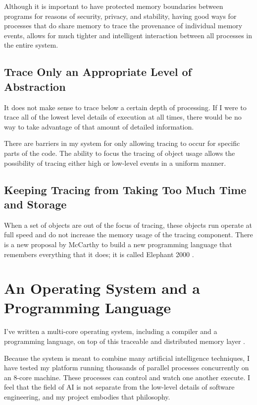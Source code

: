 Although it is important to have protected memory boundaries between
programs for reasons of security, privacy, and stability, having good
ways for processes that do share memory to trace the provenance of
individual memory events, allows for much tighter and intelligent
interaction between all processes in the entire system.
        

\subsection{Trace Only an Appropriate Level of Abstraction}

It does not make sense to trace below a certain depth of processing.
If I were to trace all of the lowest level details of execution at
all times, there would be no way to take advantage of that amount
of detailed information.

There are barriers in my system for only allowing tracing to occur for
specific parts of the code.  The ability to focus the tracing of object
usage allows the possibility of tracing either high or low-level events
in a uniform manner.

\subsection{Keeping Tracing from Taking Too Much Time and Storage}

When a set of objects are out of the focus of tracing, these objects run
operate at full speed and do not increase the memory usage of the
tracing component.  There is a new proposal by McCarthy to build a new
programming language that remembers everything that it does; it is
called Elephant 2000 \citep{mccarthy:1994}.


\section{An Operating System and a Programming Language}

I've written a multi-core operating system, including a compiler and a
programming language, on top of this traceable and distributed memory
layer \citep{morgan:2009}.

Because the system is meant to combine many artificial intelligence
techniques, I have tested my platform running thousands of parallel
processes concurrently on an 8-core machine.  These processes can
control and watch one another execute.  I feel that the field of AI
is not separate from the low-level details of software engineering,
and my project embodies that philosophy.


